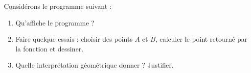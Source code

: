 
\begin{exercice}\label{exoSeconde-0084}

    Considérons le programme suivant :
    


\begin{enumerate}
    \item
        Qu'affiche le programme ?
    \item
        Faire quelque essais : choisir des points \( A\) et \( B\), calculer le point retourné par la fonction et dessiner.
    \item
        Quelle interprétation géométrique donner ? Justifier.
\end{enumerate}


\end{exercice}
